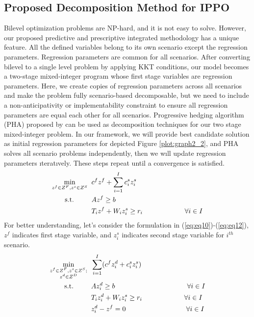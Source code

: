 \documentclass[12pt]{article}
\begin{document}
\subsection{Proposed Decomposition Method for IPPO}
Bilevel optimization problems are NP-hard, and it is not easy to solve. However, our proposed predictive and prescriptive integrated methodology has a unique feature. All the defined variables belong to its own scenario except the regression parameters. Regression parameters are common for all scenarios. After converting bilevel to a single level problem by applying KKT conditions, our model becomes a two-stage mixed-integer program whose first stage variables are regression parameters. Here, we create copies of regression parameters across all scenarios and make the problem fully scenario-based decomposable, but we need to include a non-anticipativity or implementability constraint to ensure all regression parameters are equal each other for all scenarios. Progressive hedging algorithm (PHA) proposed by \cite{RockWets91} can be used as decomposition techniques for our two stage mixed-integer problem. In our framework, we will provide best candidate solution as initial regression parameters for depicted Figure \ref{plot:graph2_2}, and PHA solves all scenario problems independently, then we wıll update regression parameters ıteratıvely. These steps repeat until a convergence is satisfied.
\begin{subequations}
\begin{flalign}
\min\limits_{z^f \in Z^F,z^s \in Z^S} \hspace{2 mm} & c^fz^f+\sum\limits_{i=1}^{I}c_i^sz_i^s \label{eq:eq10}\\
\textrm{s.t.} \hspace{9 mm} & Az^f \geq b \label{eq:eq11}\\
& T_iz^f+W_iz_i^s \geq r_i \hspace{21.6 mm} \forall i \in I \label{eq:eq12}
\end{flalign}
\end{subequations}
For better understanding, let’s consider the formulation in (\ref{eq:eq10})-(\ref{eq:eq12}), $z^f$ indicates first stage variable, and $z^s_i$ indicates second stage variable for $i^{th}$ scenario.
\begin{subequations}
\begin{flalign}
\min\limits_{\substack{z^f \in Z^F,z^s \in Z^S;\\z^d \in Z^D}} \hspace{2 mm} & \sum\limits_{i=1}^{I}(c^fz^d_i+c_i^sz_i^s) \label{eq:eq13}\\
\textrm{s.t.} \hspace{9 mm} & Az_i^d \geq b \hspace{37 mm} \forall i \in I \label{eq:eq14}\\
& T_iz^d_i+W_iz_i^s \geq r_i \hspace{21.6 mm} \forall i \in I \label{eq:eq15}\\
& z_i^d-z^f=0 \hspace{31 mm} \forall i \in I \label{eq:eq16}
\end{flalign}
\end{subequations}
\end{document}
